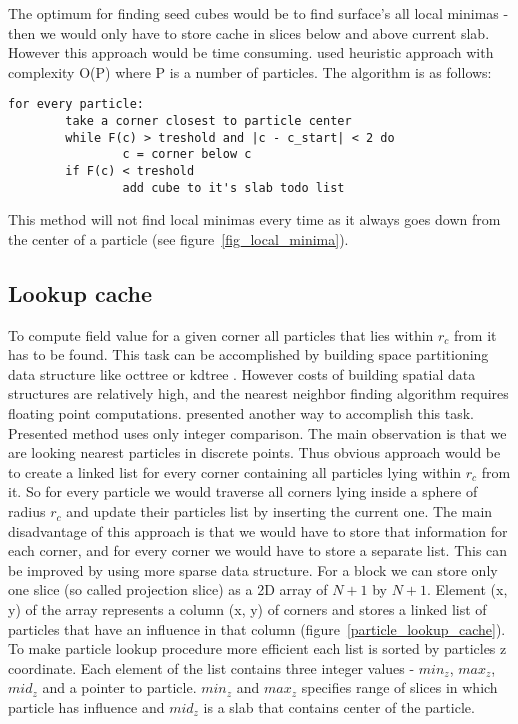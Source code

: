 The optimum for finding seed cubes would be to find surface's all local minimas - then we would only have to store cache in slices below and above current slab. However this approach would be time consuming. \cite{RosenbergBirdwell2008} used heuristic approach with complexity O(P) where P is a number of particles. The algorithm is as follows:
\begin{verbatim}
for every particle:
        take a corner closest to particle center
        while F(c) > treshold and |c - c_start| < 2 do
                c = corner below c
        if F(c) < treshold
                add cube to it's slab todo list
\end{verbatim}

This method will not find local minimas every time as it always goes down from the center of a particle (see figure~\ref{fig_local_minima}).


\subsection{Lookup cache}\label{sec:lookupcache}
To compute field value for a given corner all particles that lies within $r_c$ from it has to be found. This task can be accomplished by building space partitioning data structure like octtree or kdtree \cite{Bentley1975}. However costs of building spatial data structures are relatively high, and the nearest neighbor finding algorithm requires floating point computations. \cite{RosenbergBirdwell2008} presented another way to accomplish this task. Presented method uses only integer comparison. The main observation is that we are looking nearest particles in discrete points. Thus obvious approach would be to create a linked list for every corner containing all particles lying within $r_c$ from it. So for every particle we would traverse all corners lying inside a sphere of radius $r_c$ and update their particles list by inserting the current one.  The main disadvantage of this approach is that we would have to store that information for each corner, and for every corner we would have to store a separate list. This can be improved by using more sparse data structure. For a block we can store only one slice (so called projection slice) as a 2D array of $N+1$ by $N+1$. Element (x, y) of the array represents a column (x, y) of corners and stores a linked list of particles that have an influence in that column (figure~\ref{particle_lookup_cache}). To make particle lookup procedure more efficient each list is sorted by particles z coordinate. Each element of the list contains three integer values - $min_z$, $max_z$, $mid_z$ and a pointer to particle. $min_z$ and $max_z$ specifies range of slices in which particle has influence and $mid_z$ is a slab that contains center of the particle. 

